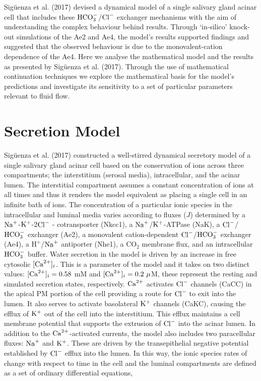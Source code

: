 \documentclass{svjour3}
\newcommand{\ca}{{\rm Ca}^{2+}}
\newcommand{\bc}{[{\rm Ca}^{2+}]_i}
\newcommand{\kplus}{{\rm K}^+}
\newcommand{\na}{{\rm Na}^+}
\newcommand{\hco}{{\rm HCO}_3^-}
\newcommand{\cl}{{\rm Cl}^-}
\begin{document}
Sig{\"u}enza et al. (2017) devised a dynamical model of a single salivary gland acinar cell that includes these $\hco$/$\cl$ exchanger mechanisms with the aim of understanding the complex behaviour behind \cite{pena2015ae4} results. Through `in-silico' knock-out simulations of the Ae2 and Ae4, the model's results supported \cite{pena2016Ae4} findings and suggested that the observed behaviour is due to the monovalent-cation dependence of the Ae4. Here we analyse the mathematical model and the results as presented by Sig{\"u}enza et al. (2017). Through the use of mathematical continuation techniques we explore the mathematical basis for the model's predictions and investigate its sensitivity to a set of particular parameters relevant to fluid flow.

\clearpage
\section{Secretion Model}
Sig{\"u}enza et al. (2017) constructed a well-stirred dynamical secretory model of a single salivary gland acinar cell based on the conservation of ions across three compartments; the interstitium (serosal media), intracellular, and the acinar lumen. The interstitial compartment assumes a constant concentration of ions at all times and thus it renders the model equivalent as placing a single cell in an infinite bath of ions. The concentration of a particular ionic species in the intracellular and luminal media varies according to fluxes ($J$) determined by a $\na$-$\kplus$-2$\cl$ - cotransporter (Nkcc1), a $\na$/$\kplus$-ATPase (NaK), a $\cl$/$\hco$ exchanger (Ae2), a monovalent cation-dependent $\cl$/$\hco$ exchanger (Ae4), a $\text{H}^+$/$\na$ antiporter (Nhe1), a CO$_2$ membrane flux, and an intracellular $\hco$ buffer. Water secretion in the model is driven by an increase in free cytosolic $\bc$. This is a parameter of the model and it takes on two distinct values: $\bc=0.58$ mM and $\bc=0.2 \ \mu$M, these represent the resting and simulated secretion states, respectively. $\ca$ activates $\cl$ channels (CaCC) in the apical PM portion of the cell providing a route for $\cl$ to exit into the lumen. It also serves to activate basolateral $\kplus$ channels (CaKC), causing the efflux of $\kplus$ out of the cell into the interstitium. This efflux maintains a cell membrane potential that supports the extrusion of $\cl$ into the acinar lumen. In addition to the $\ca$-activated currents, the model also includes two paracellular fluxes: $\na$ and $\kplus$. These are driven by the transepithelial negative potential established by $\cl$ efflux into the lumen. In this way, the ionic species rates of change with respect to time in the cell and the luminal compartments are defined as a set of ordinary differential equations,\par 
 
\end{document}
